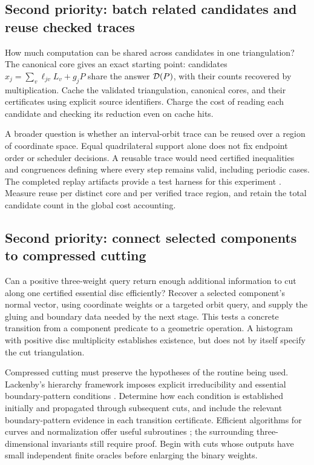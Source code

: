 \subsection{Second priority: batch related candidates and reuse checked traces}

How much computation can be shared across candidates in one triangulation?
The canonical core gives an exact starting point: candidates
$x_j=\sum_v\ell_{jv}L_v+g_jP$ share the answer $\mathcal D(P)$, with their counts
recovered by multiplication. Cache the validated triangulation, canonical
cores, and their certificates using explicit source identifiers. Charge the
cost of reading each candidate and checking its reduction even on cache hits.

A broader question is whether an interval-orbit trace can be reused over a
region of coordinate space. Equal quadrilateral support alone does not fix
endpoint order or scheduler decisions. A reusable trace would need certified
inequalities and congruences defining where every step remains valid, including
periodic cases. The completed replay artifacts provide a test harness for
this experiment \cite{AHT2006}. Measure reuse per distinct core and per
verified trace region, and retain the total candidate count in the global
cost accounting.

\subsection{Second priority: connect selected components to compressed cutting}

Can a positive three-weight query return enough additional information to
cut along one certified essential disc efficiently? Recover a selected
component's normal vector, using coordinate weights or a targeted orbit
query, and supply the gluing and boundary data needed by the next stage.
This tests a concrete transition from a component predicate to a geometric
operation. A histogram with positive disc multiplicity establishes existence,
but does not by itself specify the cut triangulation.

Compressed cutting must preserve the hypotheses of the routine being used.
Lackenby's hierarchy framework imposes explicit irreducibility and essential
boundary-pattern conditions \cite{Lackenby2026}. Determine how each condition
is established initially and propagated through subsequent cuts, and include
the relevant boundary-pattern evidence in each transition certificate.
Efficient algorithms for curves and normalization offer useful subroutines
\cite{LackenbyCurves2026}; the surrounding three-dimensional invariants still
require proof. Begin with cuts whose outputs have small independent finite
oracles before enlarging the binary weights.


